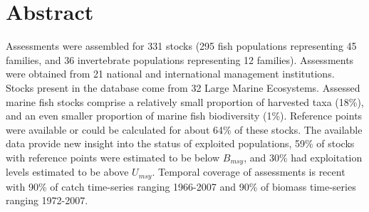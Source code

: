 \section*{Abstract}

Assessments were assembled for 331 stocks
(295 fish populations representing
45 families, and 36
invertebrate populations representing 12
families). Assessments were obtained from 21 national
and international management institutions. Stocks
present in the database come from 32 Large
Marine Ecosystems. Assessed marine fish stocks
comprise a relatively small proportion of harvested taxa
(18\%), and an even smaller proportion of
marine fish biodiversity (1\%). Reference
points were available or could be calculated for about
64\% of these stocks. The available data
provide new insight into the status of exploited populations,
59\% of stocks with reference points
were estimated to be below $B_{msy}$, and
30\% had exploitation levels
estimated to be above $U_{msy}$. Temporal coverage of assessments is
recent with 90\% of catch time-series ranging 1966-2007
and 90\% of biomass time-series ranging 1972-2007.



